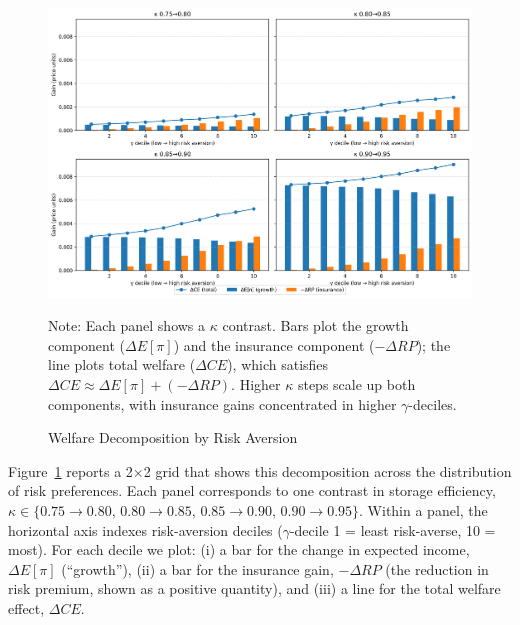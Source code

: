 \begin{figure}[ht!]
    \centering
    \includegraphics[width=\textwidth]{model_figures/storage_subsidy_gain_decomposition.png}
    \caption{Welfare Decomposition by Risk Aversion}
    \label{fig:storage_subsidy_gain_decomposition} 
    \begin{tablenotes}
    \footnotesize
    \item Note: Each panel shows a $\kappa$ contrast. Bars plot the growth component ($\Delta E[\pi]$) and the insurance component ($- \Delta RP$); the line plots total welfare ($\Delta CE$), which satisfies $\Delta CE \approx \Delta E[\pi] + (- \Delta RP)$. Higher $\kappa$ steps scale up both components, with insurance gains concentrated in higher $\gamma$-deciles.
    \end{tablenotes}
\end{figure}

Figure~\ref{fig:storage_subsidy_gain_decomposition} reports a 2×2 grid that shows this decomposition across the distribution of risk preferences. Each panel corresponds to one contrast in storage efficiency, $\kappa \in \{0.75\to0.80,\,0.80\to0.85,\,0.85\to0.90,\,0.90\to0.95\}$. Within a panel, the horizontal axis indexes risk-aversion deciles ($\gamma$-decile 1 = least risk-averse, 10 = most). For each decile we plot: (i) a bar for the change in expected income, $\Delta E[\pi]$ (``growth''), (ii) a bar for the insurance gain, $-\Delta RP$ (the reduction in risk premium, shown as a positive quantity), and (iii) a line for the total welfare effect, $\Delta CE$.

